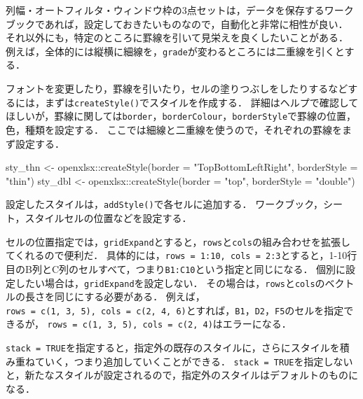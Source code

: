 \documentclass[
]{article}
\newenvironment{Shaded}{\begin{snugshade}}{\end{snugshade}}
\newcommand{\AttributeTok}[1]{\textcolor[rgb]{0.77,0.63,0.00}{#1}}
\newcommand{\FunctionTok}[1]{\textcolor[rgb]{0.00,0.00,0.00}{#1}}
\newcommand{\NormalTok}[1]{#1}
\newcommand{\OtherTok}[1]{\textcolor[rgb]{0.56,0.35,0.01}{#1}}
\newcommand{\SpecialCharTok}[1]{\textcolor[rgb]{0.00,0.00,0.00}{#1}}
\newcommand{\StringTok}[1]{\textcolor[rgb]{0.31,0.60,0.02}{#1}}
\begin{document}
列幅・オートフィルタ・ウィンドウ枠の3点セットは，データを保存するワークブックであれば，設定しておきたいものなので，自動化と非常に相性が良い．
それ以外にも，特定のところに罫線を引いて見栄えを良くしたいことがある．
例えば，全体的には縦横に細線を，\texttt{grade}が変わるところには二重線を引くとする．

フォントを変更したり，罫線を引いたり，セルの塗りつぶしをしたりするなどするには，まずは\texttt{createStyle()}でスタイルを作成する．
詳細はヘルプで確認してほしいが，罫線に関しては\texttt{border}，\texttt{borderColour}，\texttt{borderStyle}で罫線の位置，色，種類を設定する．
ここでは細線と二重線を使うので，それぞれの罫線をまず設定する．

\begin{Shaded}
\begin{Highlighting}[]
\NormalTok{sty\_thn }\OtherTok{\textless{}{-}}\NormalTok{ openxlsx}\SpecialCharTok{::}\FunctionTok{createStyle}\NormalTok{(}\AttributeTok{border =} \StringTok{"TopBottomLeftRight"}\NormalTok{, }\AttributeTok{borderStyle =} \StringTok{"thin"}\NormalTok{)}
\NormalTok{sty\_dbl }\OtherTok{\textless{}{-}}\NormalTok{ openxlsx}\SpecialCharTok{::}\FunctionTok{createStyle}\NormalTok{(}\AttributeTok{border =} \StringTok{"top"}\NormalTok{, }\AttributeTok{borderStyle =} \StringTok{"double"}\NormalTok{)}
\end{Highlighting}
\end{Shaded}

設定したスタイルは，\texttt{addStyle()}で各セルに追加する．
ワークブック，シート，スタイルセルの位置などを設定する．

セルの位置指定では，\texttt{gridExpand}とすると，\texttt{rows}と\texttt{cols}の組み合わせを拡張してくれるので便利だ．
具体的には，\texttt{rows\ =\ 1:10,\ cols\ =\ 2:3}とすると，1-10行目のB列とC列のセルすべて，つまり\texttt{B1:C10}という指定と同じになる．
個別に設定したい場合は，\texttt{gridExpand}を設定しない．
その場合は，\texttt{rows}と\texttt{cols}のベクトルの長さを同じにする必要がある．
例えば，\texttt{rows\ =\ c(1,\ 3,\ 5),\ cols\ =\ c(2,\ 4,\ 6)}とすれば，\texttt{B1}，\texttt{D2}，\texttt{F5}のセルを指定できるが，
\texttt{rows\ =\ c(1,\ 3,\ 5),\ cols\ =\ c(2,\ 4)}はエラーになる．

\texttt{stack\ =\ TRUE}を指定すると，指定外の既存のスタイルに，さらにスタイルを積み重ねていく，つまり追加していくことができる．
\texttt{stack\ =\ TRUE}を指定しないと，新たなスタイルが設定されるので，指定外のスタイルはデフォルトのものになる．
\end{document}
